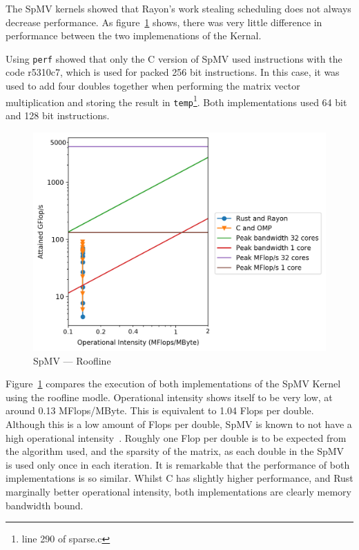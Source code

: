 The SpMV kernels showed that Rayon's work stealing scheduling does not always decrease performance. As figure~\ref{fig:roofline} shows, there was very little difference in performance between the two implemenations of the Kernal.

Using \texttt{perf} showed that only the C version of SpMV used instructions with the code r5310c7, which is used for packed 256 bit instructions. In this case, it was used to add four doubles together when performing the matrix vector multiplication and storing the result in \texttt{temp}\footnote{line 290 of sparse.c}. Both implementations used 64 bit and 128 bit instructions. 

\begin{figure}[h]
\centering
\includegraphics[width=.9\linewidth]{figs/sparse/roofline.png}
\caption{SpMV --- Roofline}\label{fig:roofline}
\end{figure}

Figure~\ref{fig:roofline} compares the execution of both implementations of the SpMV Kernel using the roofline modle. Operational intensity shows itself to be very low, at around 0.13 MFlops/MByte. This is equivalent to 1.04 Flops per double.
Although this is a low amount of Flops per double, SpMV is known to not have a high operational intensity~\cite{SparseArith}. Roughly one Flop per double is to be expected from the algorithm used, and the sparsity of the matrix, as each double in the SpMV is used only once in each iteration.
It is remarkable that the performance of both implementations is so similar. Whilst C has slightly higher performance, and Rust marginally better operational intensity, both implementations are clearly memory bandwidth bound. 

